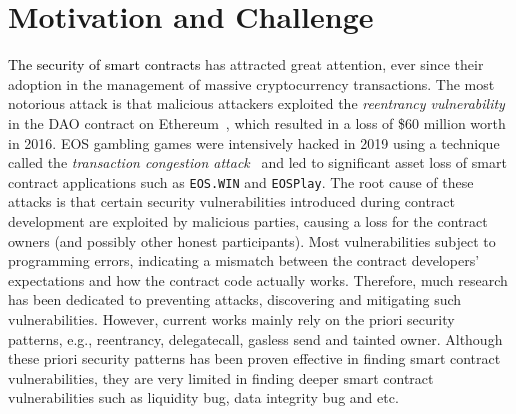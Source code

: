 \section{Motivation and Challenge}


\textcolor{black}{The security of smart contracts} has attracted great attention, ever since their adoption in the management of massive cryptocurrency transactions.
The most notorious attack is that malicious attackers exploited the \emph{reentrancy vulnerability} in the DAO contract on Ethereum~\cite{DAO_attacks}, which resulted in
a loss of \$60 million worth in 2016.
EOS gambling games were intensively hacked in 2019 using a technique called the \emph{transaction congestion attack}~\cite{EOS_attacks} and led
to significant asset loss of smart contract applications such as \texttt{EOS.WIN} and \texttt{EOSPlay}.
The root cause of these attacks is that certain security vulnerabilities introduced during contract development are exploited by malicious parties, causing a loss for the contract owners (and possibly other honest participants).
Most vulnerabilities subject to programming errors, indicating a mismatch between the contract developers' expectations and how the contract code actually works.
Therefore, much research has been dedicated to preventing attacks, discovering and mitigating such vulnerabilities.
However, current works mainly rely on the priori security patterns, e.g., reentrancy, delegatecall, gasless send and tainted owner.
Although these priori security patterns has been proven effective in finding smart contract vulnerabilities,
they are very limited in finding deeper smart contract vulnerabilities such as liquidity bug, data integrity bug and etc.

